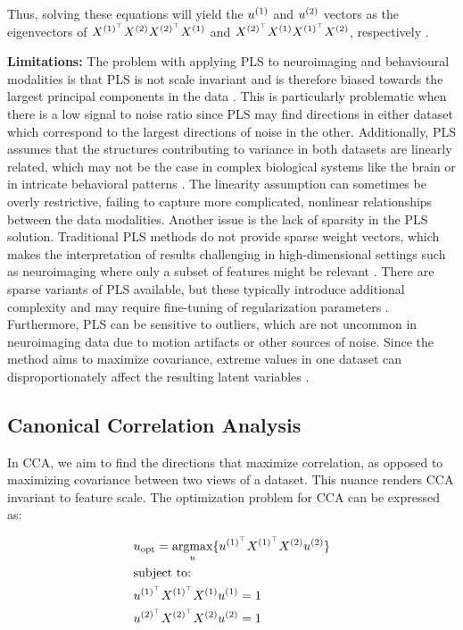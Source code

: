 Thus, solving these equations will yield the \( u^{(1)} \) and \( u^{(2)} \) vectors as the eigenvectors of \( X^{(1)^{\top}} X^{(2)} X^{(2)^{\top}} X^{(1)} \) and \( X^{(2)^{\top}} X^{(1)} X^{(1)^{\top}} X^{(2)} \), respectively \cite{hoskuldsson1988pls}.

\textbf{Limitations: } The problem with applying PLS to neuroimaging and behavioural modalities is that PLS is not scale invariant and
is therefore biased towards the largest principal components in the data \cite{helmer2020stability}.
This is particularly problematic when there is a low signal to noise ratio since PLS may find directions in either dataset which correspond to the largest directions of noise in the other.
Additionally, PLS assumes that the structures contributing to variance in both datasets are linearly related, which
may not be the case in complex biological systems like the brain or in intricate behavioral patterns \cite{rosipal2005overview}.
The linearity assumption can sometimes be overly restrictive, failing to capture more complicated, nonlinear relationships between the data modalities.
Another issue is the lack of sparsity in the PLS solution.
Traditional PLS methods do not provide sparse weight vectors, which makes the interpretation of results challenging in high-dimensional settings such as neuroimaging where only a subset of features might be relevant \cite{leurgans1993canonical}.
There are sparse variants of PLS available, but these typically introduce additional complexity and may require fine-tuning of regularization parameters \cite{chun2010sparse}.
Furthermore, PLS can be sensitive to outliers, which are not uncommon in neuroimaging data due to motion artifacts or other sources of noise.
Since the method aims to maximize covariance, extreme values in one dataset can disproportionately affect the resulting latent variables \cite{wold1975path}.

\subsection{Canonical Correlation Analysis}\label{sec:cca}

In CCA, we aim to find the directions that maximize correlation, as opposed to maximizing covariance between two views of a dataset.
This nuance renders CCA invariant to feature scale. The optimization problem for CCA can be expressed as:

\begin{align}
     & u_{\text{opt}}=\underset{u}{\mathrm{argmax}}\{ u^{(1)^{\top}}X^{(1)^{\top}}X^{(2)}u^{(2)} \} \\
     & \text{subject to:} \notag \\
     & u^{(1)^{\top}}X^{(1)^{\top}}X^{(1)}u^{(1)}=1 \notag \\
     & u^{(2)^{\top}}X^{(2)^{\top}}X^{(2)}u^{(2)}=1 \notag
\end{align}

